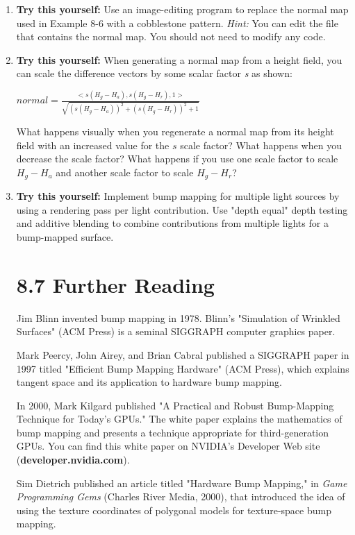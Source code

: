 \documentclass[../main.tex]{subfiles}
\begin{document}
\begin{enumerate}
\item \textbf{Try this yourself:} Use an image-editing program to replace the normal map used in Example 8-6 with a cobblestone pattern. \textit{Hint:} You can edit the file that contains the normal map. You should not need to modify any code.

\item \textbf{Try this yourself:} When generating a normal map from a height field, you can scale the difference vectors by some scalar factor \textit{s} as shown:

$
normal =\frac{<s(H_g-H_a),s(H_g-H_r),1>}{\sqrt{(s(H_g-H_a))^2+(s(H_g-H_r))^2+1}}
$

What happens visually when you regenerate a normal map from its height field with an increased value for the $s$ scale factor? What happens when you decrease the scale factor? What happens if you use one scale factor to scale $H_g-H_a$ and another scale factor to scale $H_g-H_r$?

\item \textbf{Try this yourself:} Implement bump mapping for multiple light sources by using a rendering pass per light contribution. Use "depth equal" depth testing and additive blending to combine contributions from multiple lights for a bump-mapped surface.

\section{8.7 Further Reading}

Jim Blinn invented bump mapping in 1978. Blinn's "Simulation of Wrinkled Surfaces" (ACM Press) is a seminal SIGGRAPH computer graphics paper.

Mark Peercy, John Airey, and Brian Cabral published a SIGGRAPH paper in 1997 titled "Efficient Bump Mapping Hardware" (ACM Press), which explains tangent space and its application to hardware bump mapping.

In 2000, Mark Kilgard published "A Practical and Robust Bump-Mapping Technique for Today's GPUs." The white paper explains the mathematics of bump mapping and presents a technique appropriate for third-generation GPUs. You can find this white paper on NVIDIA's Developer Web site (\textbf{developer.nvidia.com}).

Sim Dietrich published an article titled "Hardware Bump Mapping," in \textit{Game Programming Gems} (Charles River Media, 2000), that introduced the idea of using the texture coordinates of polygonal models for texture-space bump mapping.

\end{enumerate}
\end{document}

